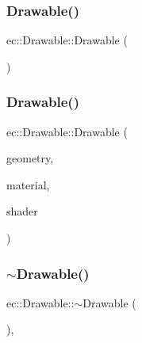 \subsubsection{\texorpdfstring{Drawable()}{Drawable()}\hspace{0.1cm}{\footnotesize\ttfamily [1/2]}}
{\footnotesize\ttfamily ec\+::\+Drawable\+::\+Drawable (\begin{DoxyParamCaption}{ }\end{DoxyParamCaption})\hspace{0.3cm}{\ttfamily [explicit]}}

\mbox{\label{classec_1_1_drawable_a1a6fee8a6543e001ee2943bda72e17cd}} 
\subsubsection{\texorpdfstring{Drawable()}{Drawable()}\hspace{0.1cm}{\footnotesize\ttfamily [2/2]}}
{\footnotesize\ttfamily ec\+::\+Drawable\+::\+Drawable (\begin{DoxyParamCaption}\item[{\mbox{\hyperlink{classec_1_1_i_geometry_access}{I\+Geometry\+Access}} $\ast$}]{geometry,  }\item[{\mbox{\hyperlink{classec_1_1_material}{Material}} $\ast$}]{material,  }\item[{\mbox{\hyperlink{classec_1_1_shader}{Shader}} $\ast$}]{shader }\end{DoxyParamCaption})\hspace{0.3cm}{\ttfamily [explicit]}}

\mbox{\label{classec_1_1_drawable_a4a82e5cd6d6a47ad86ed42cfdda512d8}} 
\subsubsection{\texorpdfstring{$\sim$\+Drawable()}{~Drawable()}}
{\footnotesize\ttfamily ec\+::\+Drawable\+::$\sim$\+Drawable (\begin{DoxyParamCaption}{ }\end{DoxyParamCaption})\hspace{0.3cm}{\ttfamily [virtual]}, {\ttfamily [default]}}



